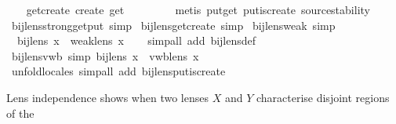 \begin{isabellebody}
%
\isadelimproof
\isanewline
%
\endisadelimproof
\isanewline
\ \ \isamarkupfalse%
\ get{\isacharunderscore}create{\isacharcolon}\ {\isachardoublequoteopen}create\ {\isacharparenleft}get\ {\isasymsigma}{\isacharparenright}\ {\isacharequal}\ {\isasymsigma}{\isachardoublequoteclose}\isanewline
%
\isadelimproof
\ \ \ \ %
\endisadelimproof
%
\isatagproof
{}\isamarkupfalse%
\ {\isacharparenleft}metis\ put{\isacharunderscore}get\ put{\isacharunderscore}is{\isacharunderscore}create\ source{\isacharunderscore}stability{\isacharparenright}%
\endisatagproof
{\isafoldproof}%
%
\isadelimproof
\isanewline
%
\endisadelimproof
\isanewline
{}\isamarkupfalse%
\isanewline
\isanewline
{}\isamarkupfalse%
\ bij{\isacharunderscore}lens{\isachardot}strong{\isacharunderscore}get{\isacharunderscore}put\ {\isacharbrackleft}simp{\isacharbrackright}\isanewline
{}\isamarkupfalse%
\ bij{\isacharunderscore}lens{\isachardot}get{\isacharunderscore}create\ {\isacharbrackleft}simp{\isacharbrackright}\isanewline
\isanewline
{}\isamarkupfalse%
\ bij{\isacharunderscore}lens{\isacharunderscore}weak\ {\isacharbrackleft}simp{\isacharbrackright}{\isacharcolon}\isanewline
\ \ {\isachardoublequoteopen}bij{\isacharunderscore}lens\ x\ {\isasymLongrightarrow}\ weak{\isacharunderscore}lens\ x{\isachardoublequoteclose}\isanewline
%
\isadelimproof
\ \ %
\endisadelimproof
%
\isatagproof
{}\isamarkupfalse%
\ {\isacharparenleft}simp{\isacharunderscore}all\ add{\isacharcolon}\ bij{\isacharunderscore}lens{\isacharunderscore}def{\isacharparenright}%
\endisatagproof
{\isafoldproof}%
%
\isadelimproof
\isanewline
%
\endisadelimproof
\isanewline
{}\isamarkupfalse%
\ bij{\isacharunderscore}lens{\isacharunderscore}vwb\ {\isacharbrackleft}simp{\isacharbrackright}{\isacharcolon}\ {\isachardoublequoteopen}bij{\isacharunderscore}lens\ x\ {\isasymLongrightarrow}\ vwb{\isacharunderscore}lens\ x{\isachardoublequoteclose}\isanewline
%
\isadelimproof
\ \ %
\endisadelimproof
%
\isatagproof
{}\isamarkupfalse%
\ {\isacharparenleft}unfold{\isacharunderscore}locales{\isacharcomma}\ simp{\isacharunderscore}all\ add{\isacharcolon}\ bij{\isacharunderscore}lens{\isachardot}put{\isacharunderscore}is{\isacharunderscore}create{\isacharparenright}%
\endisatagproof
{\isafoldproof}%
%
\isadelimproof
%
\endisadelimproof
%
\isamarkuptrue%
%
\begin{isamarkuptext}%
Lens independence shows when two lenses $X$ and $Y$ characterise disjoint regions of the 

\end{isamarkuptext}
\end{isabellebody}
